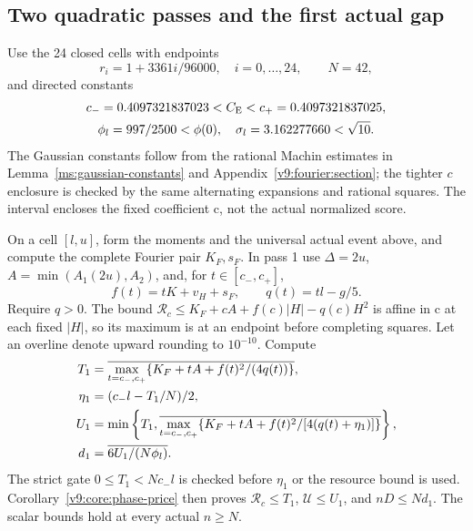 \subsection{Two quadratic passes and the first actual gap}
\label{v9:entry:raw-cover}
Use the 24 closed cells with endpoints
\[
 r_i=1+3361i/96000,\quad i=0,\ldots,24,
 \qquad N=42,
\]
and directed constants
\begin{gather*}
 c_-=0.4097321837023<C_{\mathrm E}<c_+=0.4097321837025,\\
 \phi_l=997/2500<\phi(0),\quad\sigma_l=3.162277660<\sqrt{10}.
\end{gather*}
The Gaussian constants follow from the rational Machin estimates in
Lemma~\ref{ms:gaussian-constants} and Appendix~\ref{v9:fourier:section};
the tighter $c$ enclosure is checked by the same alternating expansions
and rational squares. The interval encloses the fixed coefficient c,
not the actual normalized score.

On a cell $[l,u]$, form the moments and the universal actual event above,
and compute the complete Fourier pair $K_F,s_F$. In pass 1 use
$\Delta=2u$, $A=\min(A_1(2u),A_2)$, and, for $t\in[c_-,c_+]$,
\[
 f(t)=tK+v_H+s_F,\qquad q(t)=tl-g/5.
\]
Require $q>0$. The bound
$\mathcal R_c\le K_F+cA+f(c)|H|-q(c)H^2$ is affine in c at each
fixed $|H|$, so its maximum is at an endpoint before completing squares.
Let an overline denote upward rounding to $10^{-10}$. Compute
\begin{align}
 T_1&=\overline{\max_{t=c_-,c_+}
                     \{K_F+tA+f(t)^2/(4q(t))\}},\notag\\
 \eta_1&=(c_-l-T_1/N)/2,\notag\\
 U_1&=\min\left\{T_1,
       \overline{\max_{t=c_-,c_+}
          \{K_F+tA+f(t)^2/[4(q(t)+\eta_1)]\}}\right\},\notag\\
 d_1&=\overline{6U_1/(N\phi_l)}.\label{v9:entry:first-pass}
\end{align}
The strict gate $0\le T_1<Nc_-l$ is checked before $\eta_1$ or the
resource bound is used. Corollary~\ref{v9:core:phase-price} then proves
$\mathcal R_c\le T_1$, $\mathcal U\le U_1$, and $nD\le Nd_1$.
The scalar bounds hold at every actual $n\ge N$.

